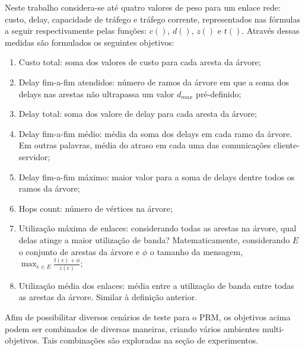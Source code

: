 Neste trabalho considera-se até quatro valores de peso para um enlace rede: custo, delay, capacidade de tráfego e tráfego corrente, representados nas fórmulas a seguir respectivamente pelas funções: $c()$, $d()$, $z()$ e $t()$. Através dessas medidas são formulados os seguintes objetivos:

\begin{enumerate} 
	\item Custo total: soma dos valores de custo para cada aresta da árvore;
	\item Delay fim-a-fim atendidos: número de ramos da árvore em que a soma dos delays nas arestas não ultrapassa um valor $d_{max}$ pré-definido;
	\item Delay total: soma dos valore de delay para cada aresta da árvore;
	\item Delay fim-a-fim médio: média da soma dos delays em cada ramo da árvore. Em outras palavras, média do atraso em cada uma das comunicações cliente-servidor;
	\item Delay fim-a-fim máximo: maior valor para a soma de delays dentre todos os ramos da árvore;
	\item Hops count: número de vértices na árvore;
	\item Utilização máxima de enlaces: considerando todas as arestas na árvore, qual delas atinge a maior utilização de banda? Matematicamente, considerando $E$ o conjunto de arestas da árvore e $\phi$ o tamanho da mensagem, $\max_{e \in E} \frac{t(e) + \phi}{z(e)}$;
	\item Utilização média dos enlaces: média entre a utilização de banda entre todas as arestas da árvore. Similar à definição anterior.
\end{enumerate}

Afim de possibilitar diversos cenários de teste para o PRM, os objetivos acima podem ser combinados de diversas maneiras, criando vários ambientes multi-objetivos. Tais combinações são exploradas na seção de experimentos.
